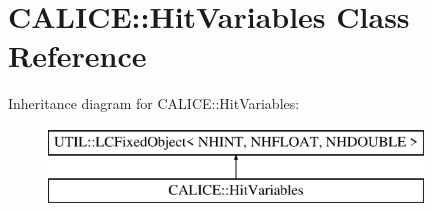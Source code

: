 \section{C\-A\-L\-I\-C\-E\-:\-:Hit\-Variables Class Reference}
\label{classCALICE_1_1HitVariables}
Inheritance diagram for C\-A\-L\-I\-C\-E\-:\-:Hit\-Variables\-:\begin{figure}[H]
\begin{center}
\leavevmode
\includegraphics[height=2.000000cm]{classCALICE_1_1HitVariables}
\end{center}
\end{figure}
